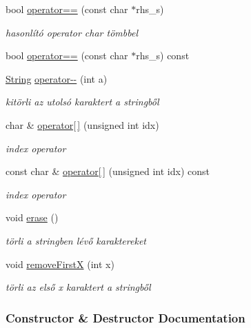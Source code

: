 \begin{DoxyCompactItemize}
bool \mbox{\hyperlink{class_string_ade9af860a809548214837e33367e8835}{operator==}} (const char $\ast$rhs\+\_\+s)
\begin{DoxyCompactList}\small\item\em hasonlító operator char tömbbel \end{DoxyCompactList}\item 
bool \mbox{\hyperlink{class_string_aa50c56cbbbc9956cb359a7617f13809b}{operator==}} (const char $\ast$rhs\+\_\+s) const
\item 
\mbox{\hyperlink{class_string}{String}} \mbox{\hyperlink{class_string_a79869b69dd0106b1b6d179f760d6527a}{operator-\/-\/}} (int a)
\begin{DoxyCompactList}\small\item\em kitörli az utolsó karaktert a stringből \end{DoxyCompactList}\item 
char \& \mbox{\hyperlink{class_string_a1a7c5c39d4dafbbf8516f5058a253f1a}{operator\mbox{[}$\,$\mbox{]}}} (unsigned int idx)
\begin{DoxyCompactList}\small\item\em index operator \end{DoxyCompactList}\item 
const char \& \mbox{\hyperlink{class_string_aaa249e62641872197679cfc7c66118c0}{operator\mbox{[}$\,$\mbox{]}}} (unsigned int idx) const
\begin{DoxyCompactList}\small\item\em index operator \end{DoxyCompactList}\item 
void \mbox{\hyperlink{class_string_a3ce2ea55be9ec912bb2dbc88d461b479}{erase}} ()
\begin{DoxyCompactList}\small\item\em törli a stringben lévő karaktereket \end{DoxyCompactList}\item 
void \mbox{\hyperlink{class_string_a15c07ede44c5bcfb0920e9bf63e75670}{remove\+FirstX}} (int x)
\begin{DoxyCompactList}\small\item\em törli az első x karaktert a stringből \end{DoxyCompactList}\end{DoxyCompactItemize}


\subsubsection{Constructor \& Destructor Documentation}
\mbox{\label{class_string_a8a7ef356e05eb9b1ea1ab518baee3095}} 

